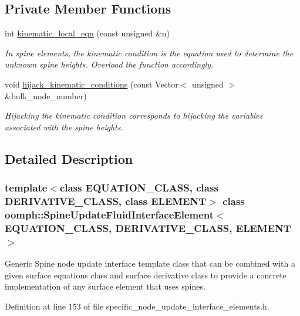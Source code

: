 \subsection*{Private Member Functions}
\begin{DoxyCompactItemize}
\item 
int \hyperlink{classoomph_1_1SpineUpdateFluidInterfaceElement_a94f737e046cb2796cb2b2dd5534bd3cd}{kinematic\+\_\+local\+\_\+eqn} (const unsigned \&n)
\begin{DoxyCompactList}\small\item\em In spine elements, the kinematic condition is the equation used to determine the unknown spine heights. Overload the function accordingly. \end{DoxyCompactList}\item 
void \hyperlink{classoomph_1_1SpineUpdateFluidInterfaceElement_aafe4d848b76bb62c987bdb9852c117bb}{hijack\+\_\+kinematic\+\_\+conditions} (const Vector$<$ unsigned $>$ \&bulk\+\_\+node\+\_\+number)
\begin{DoxyCompactList}\small\item\em Hijacking the kinematic condition corresponds to hijacking the variables associated with the spine heights. \end{DoxyCompactList}\end{DoxyCompactItemize}


\subsection{Detailed Description}
\subsubsection*{template$<$class E\+Q\+U\+A\+T\+I\+O\+N\+\_\+\+C\+L\+A\+SS, class D\+E\+R\+I\+V\+A\+T\+I\+V\+E\+\_\+\+C\+L\+A\+SS, class E\+L\+E\+M\+E\+NT$>$\newline
class oomph\+::\+Spine\+Update\+Fluid\+Interface\+Element$<$ E\+Q\+U\+A\+T\+I\+O\+N\+\_\+\+C\+L\+A\+S\+S, D\+E\+R\+I\+V\+A\+T\+I\+V\+E\+\_\+\+C\+L\+A\+S\+S, E\+L\+E\+M\+E\+N\+T $>$}

Generic Spine node update interface template class that can be combined with a given surface equations class and surface derivative class to provide a concrete implementation of any surface element that uses spines. 

Definition at line 153 of file specific\+\_\+node\+\_\+update\+\_\+interface\+\_\+elements.\+h.



